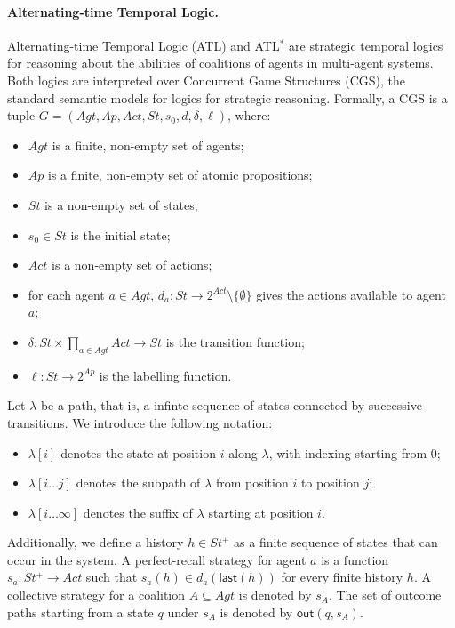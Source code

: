 \paragraph{Alternating-time Temporal Logic.}
Alternating-time Temporal Logic (ATL) and ATL$^*$ are strategic temporal logics
for reasoning about the abilities of coalitions of agents in multi-agent systems.
Both logics are interpreted over Concurrent Game Structures (CGS), the standard semantic models for logics for strategic reasoning. Formally, a CGS is a tuple
$G = (Agt, Ap, Act, St, s_0, d, \delta, \ell)$, where:
\begin{itemize}
  \item[-] $Agt$ is a finite, non-empty set of agents;
  \item[-] $Ap$ is a finite, non-empty set of atomic propositions;
  \item[-] $St$ is a non-empty set of states;
  \item[-] $s_0 \in St$ is the initial state;
  \item[-] $Act$ is a non-empty set of actions;
  \item[-] for each agent $a \in Agt$, $d_a : St \to 2^{Act} \setminus \{\emptyset\}$ gives the actions available to agent $a$;
  \item[-] $\delta : St \times \prod_{a \in Agt} Act \to St$ is the transition function;
  \item[-] $\ell : St \to 2^{Ap}$ is the labelling function.
\end{itemize}
Let $\lambda$ be a path, that is, a infinte sequence of states connected by successive transitions. We introduce the following notation:
\begin{itemize}
\renewcommand{\labelitemi}{-}
    \item $\lambda[i]$ denotes the state at position $i$ along $\lambda$, with indexing starting from $0$;
    \item $\lambda[i \dots j]$ denotes the subpath of $\lambda$ from position $i$ to position $j$;
    \item $\lambda[i \dots \infty]$ denotes the suffix of $\lambda$ starting at position $i$.
\end{itemize}
Additionally, we define a history $h \in St^+$ as a finite sequence of states that can occur in the system.
A perfect-recall strategy for agent $a$ is a function
$s_a : St^+ \to Act$ such that $s_a(h) \in d_a(\mathsf{last}(h))$ for every finite history $h$.
A collective strategy for a coalition $A \subseteq Agt$ is denoted by $s_A$.
The set of outcome paths starting from a state $q$ under $s_A$ is denoted by
$\mathsf{out}(q,s_A)$.

